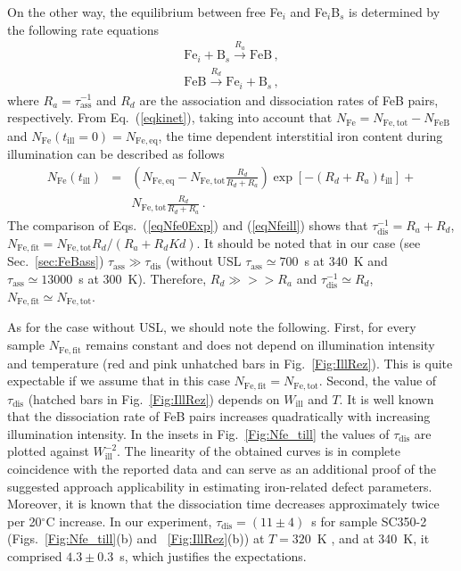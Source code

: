 \documentclass[%
 aip,jap,
 amsmath,amssymb,
 reprint,%
]{revtex4-1}
\begin{document}
On the other way,
the equilibrium between free Fe$_i$ and Fe$_i$B$_s$ is determined by the following rate equations
\begin{eqnarray}
\label{eqkinet}
\mathrm{Fe}_i+\mathrm{B}_s\xrightarrow{R_a}\mathrm{FeB}\,,\nonumber\\
\mathrm{FeB}\xrightarrow{R_d}\mathrm{Fe}_i+\mathrm{B}_s\,,
\end{eqnarray}
where 
$R_a=\tau_\mathrm{ass}^{-1}$ and 
$R_d$ are the association and dissociation rates of FeB pairs, respectively. 
From Eq.~(\ref{eqkinet}), taking into account that 
$N_\mathrm{Fe}=N_\mathrm{Fe,tot}-N_\mathrm{FeB}$ 
and 
$N_\mathrm{Fe}(t_\mathrm{ill}=0)=N_\mathrm{Fe,eq}$, 
the time dependent interstitial iron content during illumination can be described as follows
\begin{eqnarray}
\label{eqNfeill}
N_\mathrm{Fe}(t_\mathrm{ill})&=&\left(N_\mathrm{Fe,eq}-N_\mathrm{Fe,tot}
\frac{R_d}{R_d+R_a}\right)\exp[-(R_d+R_a)t_\mathrm{ill}]+\nonumber\\
&&N_\mathrm{Fe,tot}\frac{R_d}{R_d+R_a}\,.
\end{eqnarray}
The comparison of Eqs.~(\ref{eqNfe0Exp}) and (\ref{eqNfeill}) shows that 
$\tau_\mathrm{dis}^{-1}=R_a+R_d$, 
$N_\mathrm{Fe,fit}=N_\mathrm{Fe,tot}R_d/(R_a+R_dKd)$. 
It should be noted that in our case 
(see Sec.~\ref{sec:FeBass}) $\tau_\mathrm{ass}\gg \tau_\mathrm{dis}$ 
(without USL $\tau_\mathrm{ass}\simeq700$~s at 340~K and $\tau_\mathrm{ass}\simeq13000$~s at 300~K). Therefore, $R_d\gg>>R_a$ and $\tau_\mathrm{dis}^{-1}\simeq R_d$, 
$N_\mathrm{Fe,fit}\simeq N_\mathrm{Fe,tot}$.

As for the case without USL, we should note the following. 
First, for every sample $N_\mathrm{Fe,fit}$ remains constant and does not depend on illumination intensity and temperature (red and pink unhatched bars in Fig.~\ref{Fig:IllRez}). 
This is quite expectable if we assume that 
in this case $N_\mathrm{Fe,fit}=N_\mathrm{Fe,tot}$. 
Second, the value of $\tau_\mathrm{dis}$ (hatched bars in Fig.~\ref{Fig:IllRez}) 
depends on $W_\mathrm{ill}$ and $T$. 
It is well known \cite{Schmidt2019,FeBLight2,FeBKin2019} that the dissociation rate of FeB pairs increases quadratically with increasing illumination intensity.
In the insets in Fig.~\ref{Fig:Nfe_till} the values of $\tau_\mathrm{dis}$
are plotted against $W_\mathrm{ill}^{-2}$. 
The linearity of the obtained curves is in complete coincidence 
with the reported data and can serve as an additional proof of the suggested approach 
applicability in estimating iron-related defect parameters. 
Moreover, it is known \cite{Lagowskii1993} that the dissociation time decreases approximately twice per 20$^\circ$C increase.
In our experiment, $\tau_\mathrm{dis}=(11\pm4)$~s for sample SC350-2 
(Figs.~\ref{Fig:Nfe_till}(b) and ~\ref{Fig:IllRez}(b)) at $T=320$~K , and at 340~K,  
it comprised $4.3\pm0.3$~s, which justifies the expectations.
\end{document}
